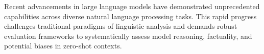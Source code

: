 \documentclass{article}
\begin{document}
Recent advancements in large language models have demonstrated unprecedented capabilities across diverse natural language processing tasks. This rapid progress challenges traditional paradigms of linguistic analysis and demands robust evaluation frameworks to systematically assess model reasoning, factuality, and potential biases in zero-shot contexts.
\end{document}
